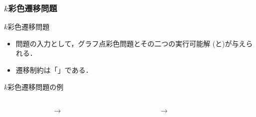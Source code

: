 \documentclass[dvipdfmx,11pt]{beamer}
\begin{document}
\begin{frame}\frametitle{$k$彩色遷移問題}

  \begin{block}{$k$彩色遷移問題}
    \begin{itemize}
    \item 問題の入力として，グラフ点彩色問題とその二つの実行可能解
          (と)が与えられる．
    \item 遷移制約は「」である．
    \end{itemize}
  \end{block}

  \begin{exampleblock}{$k$彩色遷移問題の例}
    \begin{columns}
      \begin{column}{0.3\textwidth}
        \centering
        
      \end{column}
      \begin{column}{0.05\textwidth}
        \textbf{$\longrightarrow$}
      \end{column}
      \begin{column}[]{0.3\textwidth}
        \centering
        
      \end{column}
      \begin{column}{0.05\textwidth}
        \textbf{$\longrightarrow$}
      \end{column}
      \begin{column}{0.3\textwidth}
        \centering
        
      \end{column}
    \end{columns}
  \end{exampleblock}
  
\end{frame}
\end{document}

